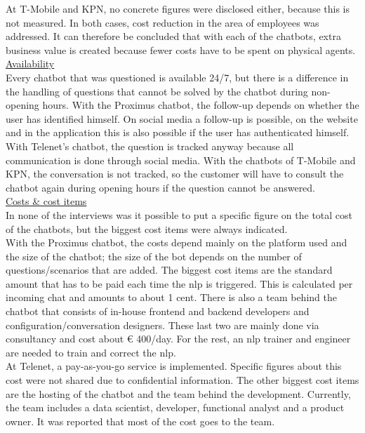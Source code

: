 \break
At T-Mobile and KPN, no concrete figures were disclosed either, because this is not measured. In both cases, cost reduction in the area of employees was addressed. It can therefore be concluded that with each of the chatbots, extra business value is created because fewer costs have to be spent on physical agents.\\
\break
\ul{Availability}\\
Every chatbot that was questioned is available 24/7, but there is a difference in the handling of questions that cannot be solved by the chatbot during non-opening hours.
With the Proximus chatbot, the follow-up depends on whether the user has identified himself. On social media a follow-up is possible, on the website and in the application this is also possible if the user has authenticated himself. With Telenet's chatbot, the question is tracked anyway because all communication is done through social media. With the chatbots of T-Mobile and KPN, the conversation is not tracked, so the customer will have to consult the chatbot again during opening hours if the question cannot be answered.\\
\break
\ul{Costs \& cost items}\\
In none of the interviews was it possible to put a specific figure on the total cost of the chatbots, but the biggest cost items were always indicated.\\
\break
With the Proximus chatbot, the costs depend mainly on the platform used and the size of the chatbot; the size of the bot depends on the number of questions/scenarios that are added. The biggest cost items are the standard amount that has to be paid each time the \acrshort{nlp} is triggered. This is calculated per incoming chat and amounts to about 1 cent. There is also a team behind the chatbot that consists of in-house frontend and backend developers and configuration/conversation designers. These last two are mainly done via consultancy and cost about € 400/day. For the rest, an \acrshort{nlp} trainer and engineer are needed to train and correct the \acrshort{nlp}.\\  
\break
At Telenet, a pay-as-you-go service is implemented. Specific figures about this cost were not shared due to confidential information. The other biggest cost items are the hosting of the chatbot and the team behind the development. Currently, the team includes a data scientist, developer, functional analyst and a product owner. It was reported that most of the cost goes to the team.\\
